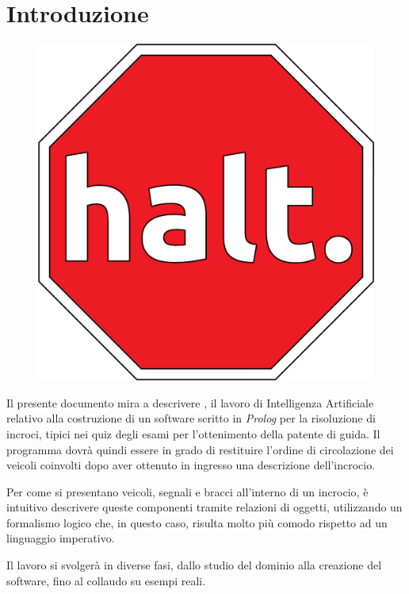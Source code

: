 \chapter{Introduzione}

\vspace{-4em}

\begin{figure}[!htb]
	\centering
	\includegraphics[scale=.15]{images/halt}
\end{figure}

Il presente documento mira a descrivere , il lavoro di Intelligenza Artificiale relativo alla costruzione di un software scritto in \emph{Prolog} per la risoluzione di incroci, tipici nei quiz degli esami per l'ottenimento della patente di guida. Il programma dovrà quindi essere in grado di restituire l'ordine di circolazione dei veicoli coinvolti dopo aver ottenuto in ingresso una descrizione dell'incrocio.

Per come si presentano veicoli, segnali e bracci all'interno di un incrocio, è intuitivo descrivere queste componenti tramite relazioni di oggetti, utilizzando un formalismo logico che, in questo caso, risulta molto più comodo rispetto ad un linguaggio imperativo. 

Il lavoro si svolgerà in diverse fasi, dallo studio del dominio alla creazione del software, fino al collaudo su esempi reali.

